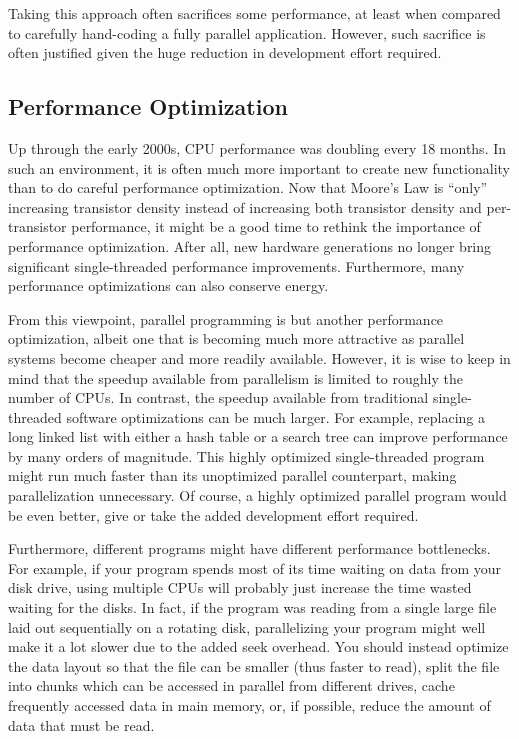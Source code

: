 Taking this approach often sacrifices some performance, at least when
compared to carefully hand-coding a fully parallel application.
However, such sacrifice is often justified given the huge reduction in
development effort required.

\subsection{Performance Optimization}
\label{sec:intro:Performance Optimization}

Up through the early 2000s, CPU performance was doubling every 18 months.
In such an environment, it is often much more important to create new
functionality than to do careful performance optimization.
Now that Moore's Law is ``only'' increasing transistor density instead
of increasing both transistor density and per-transistor performance,
it might be a good time to rethink the importance of performance
optimization.
After all, new hardware generations no longer bring significant
single-threaded performance improvements.
Furthermore, many performance optimizations can also conserve energy.

From this viewpoint, parallel programming is but another performance
optimization, albeit one that is becoming much more attractive
as parallel systems become cheaper and more readily available.
However, it is wise to keep in mind that the speedup available from
parallelism is limited to roughly the number of CPUs.
In contrast, the speedup available from traditional single-threaded
software optimizations can be much larger.
For example, replacing a long linked list with either a hash table
or a search tree can improve performance by many orders of magnitude.
This highly optimized single-threaded program might run much
faster than its unoptimized parallel counterpart, making parallelization
unnecessary.
Of course, a highly optimized parallel program would be even better,
give or take the added development effort required.

Furthermore, different programs might have different performance
bottlenecks.
For example, if your program spends most of its time
waiting on data from your disk drive,
using multiple CPUs will probably just increase the time wasted waiting
for the disks.
In fact, if the program was reading from a single large file laid out
sequentially on a rotating disk, parallelizing your program might
well make it a lot slower due to the added seek overhead.
You should instead optimize the data layout so that
the file can be smaller (thus faster to read), split the file into chunks
which can be accessed in parallel from different drives, 
cache frequently accessed data in main memory,
or, if possible,
reduce the amount of data that must be read.

